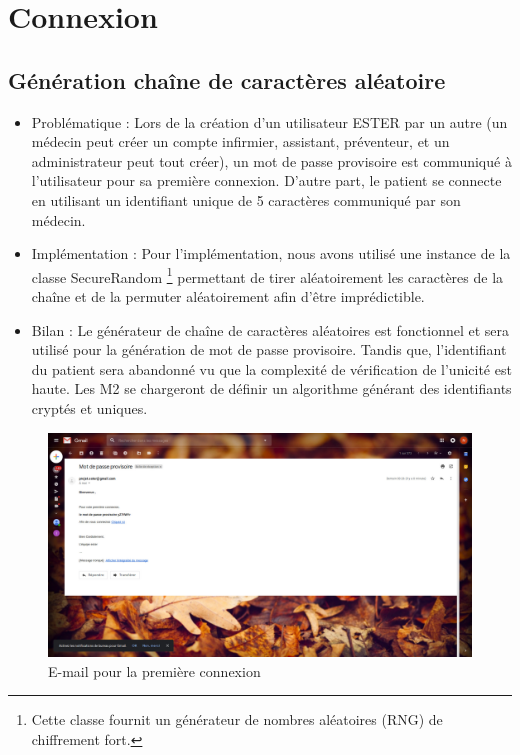 \section{Connexion}

\subsection{Génération chaîne de caractères aléatoire}
    
\begin{itemize} 
\item Problématique :
Lors de la création d’un utilisateur ESTER par un autre (un médecin peut créer un compte infirmier, assistant, préventeur, et un administrateur peut tout créer), un mot de passe provisoire est communiqué à l’utilisateur pour sa première connexion.
D’autre part, le patient se connecte en utilisant un identifiant unique de 5 caractères communiqué par son médecin.
\item  Implémentation :
Pour l’implémentation, nous avons utilisé une instance de la classe SecureRandom \footnote{Cette classe fournit un générateur de nombres aléatoires (RNG) de chiffrement fort.} permettant de tirer aléatoirement les caractères de la chaîne et de la permuter aléatoirement afin d’être imprédictible.
\item  Bilan :
Le générateur de chaîne de caractères aléatoires est fonctionnel et sera utilisé pour la génération de mot de passe provisoire. Tandis que, l’identifiant du patient sera abandonné vu que la complexité de vérification de l’unicité est haute. Les M2 se chargeront de définir un algorithme générant des identifiants cryptés et uniques.

\end{itemize}

\begin{figure}[H]
    \begin{center}
	\includegraphics[scale=0.25]{img/connexion/mailCo}
    \end{center}
    \caption{E-mail pour la première connexion}
\end{figure}

